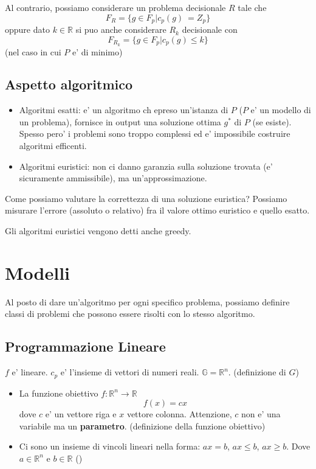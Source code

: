 Al contrario, possiamo considerare un problema decisionale $ R $ tale che 
\[
  F_R = \{g \in F_p | c_p(g)\ = Z_p\}
\]
oppure dato $ k \in \mathbb{R} $ si puo anche considerare $ R_k $ decisionale con 
\[
  F_{R_k} = \{ g \in F_p | c_p(g) \leq k\}
\]
(nel caso in cui $ P $ e' di minimo)

\subsection{Aspetto algoritmico}
\begin{itemize}
  \item Algoritmi esatti: e' un algoritmo ch epreso un'istanza di $ P $ ($ P $ e' un modello di un problema), fornisce in output una soluzione ottima $ g^* $ di $ P $ (se esiste). Spesso pero' i problemi sono troppo complessi ed e' impossibile costruire algoritmi efficenti.
  \item Algoritmi euristici: non ci danno garanzia sulla soluzione trovata (e' sicuramente ammissibile), ma un'approssimazione.
\end{itemize}

Come possiamo valutare la correttezza di una soluzione euristica? Possiamo misurare l'errore (assoluto o relativo) fra il valore ottimo euristico e quello esatto.

Gli algoritmi euristici vengono detti anche greedy.

\section{Modelli}
Al posto di dare un'algoritmo per ogni specifico problema, possiamo definire classi di problemi che possono essere risolti con lo stesso algoritmo.

\subsection{Programmazione Lineare}

$ f $ e' lineare. 
$ c_p $ e' l'insieme di vettori di numeri reali. $ \mathbb{G} = \mathbb{R}^n $. (definizione di $ G $)

\begin{itemize}
\item La funzione obiettivo $ f: \mathbb{R}^n \to \mathbb{R} $
  \[
    f(x) = cx
  \]
    dove $ c $ e' un vettore riga e $ x $ vettore colonna. Attenzione, $ c $ non e' una variabile ma un \textbf{parametro}. (definizione della funzione obiettivo)
  \item Ci sono un insieme di vincoli lineari nella forma: $ ax = b $, $ ax \leq b $, $ ax \geq b $. Dove $ a \in \mathbb{R}^n $ e $ b \in \mathbb{R} $ ()
\end{itemize}

